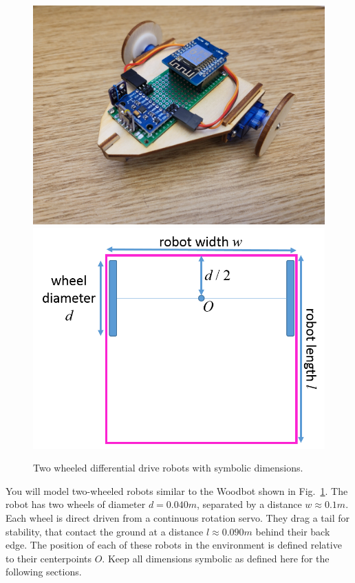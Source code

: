 \documentclass[letterpaper,11pt]{article}
\begin{document}
\begin{figure}[h!]
  \centering
   \qquad
  \includegraphics[keepaspectratio,width=\textwidth,height=.15\textheight]{Woodbot.jpg}
  \includegraphics[keepaspectratio,width=\textwidth,height=.15\textheight]{robot}
  \caption{Two wheeled differential drive robots with symbolic dimensions.}
  \label{fg:robot}
\end{figure}

You will model two-wheeled robots similar to the Woodbot shown in Fig.~\ref{fg:robot}. The robot has two wheels of diameter $d = 0.040m 
$, separated by a distance $w \approx 0.1m
$.  Each wheel is direct driven from a continuous rotation servo.  They drag a tail for stability, that contact the ground at a distance $l \approx 0.090m
$ behind their back edge.  The position of each of these robots in the environment is defined relative to their centerpoints $O$. Keep all dimensions symbolic as defined here for the following sections.
\end{document}
